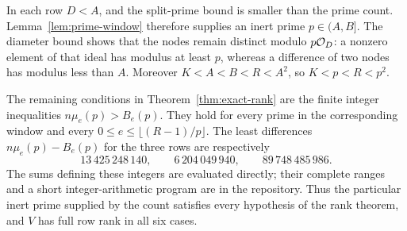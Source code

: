 In each row $D<A$, and the split-prime bound is smaller than the prime
count. Lemma~\ref{lem:prime-window} therefore supplies an inert prime
$p\in(A,B]$. The diameter bound shows that the nodes remain distinct
modulo $p\mathcal O_D$: a nonzero element of that ideal has modulus at least $p$,
whereas a difference of two nodes has modulus less than $A$.
Moreover $K<A<B<R<A^2$, so $K<p<R<p^2$.

The remaining conditions in Theorem~\ref{thm:exact-rank} are the finite
integer inequalities $n\mu_e(p)>B_e(p)$. They hold for every prime in the
corresponding window and every $0\leq e\leq\lfloor(R-1)/p\rfloor$.
The least differences $n\mu_e(p)-B_e(p)$ for the three rows are respectively
\[
 13\,425\,248\,140,\qquad 6\,204\,049\,940,\qquad 89\,748\,485\,986.
\]
The sums defining these integers are evaluated directly; their complete
ranges and a short integer-arithmetic program are in the repository.
Thus the particular inert prime supplied by the count satisfies every
hypothesis of the rank theorem, and $V$ has full row rank in all six cases.
